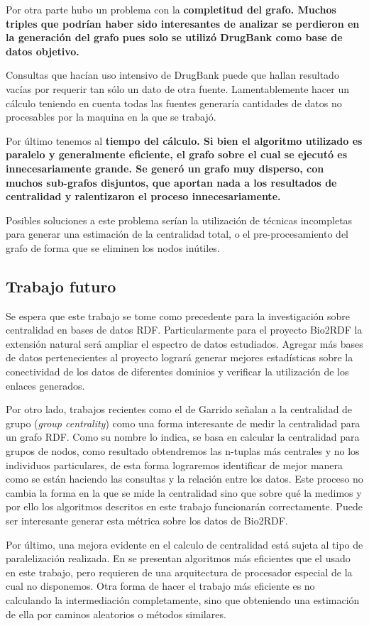 Por otra parte hubo un problema con la \bf{completitud del grafo.}
Muchos triples que podrían haber sido interesantes de analizar se perdieron en
la generación del grafo pues solo se utilizó DrugBank como base de datos
objetivo.

Consultas que hacían uso intensivo de DrugBank puede que hallan resultado vacías
por requerir tan sólo un dato de otra fuente.
Lamentablemente hacer un cálculo teniendo en cuenta todas las fuentes generaría
cantidades de datos no procesables por la maquina en la que se trabajó.

Por último tenemos al \bf{tiempo del cálculo.}
Si bien el algoritmo utilizado es paralelo y generalmente eficiente, el grafo
sobre el cual se ejecutó es innecesariamente grande. 
Se generó un grafo muy disperso, con muchos sub-grafos disjuntos, que aportan
nada a los resultados de centralidad y ralentizaron el proceso innecesariamente.

Posibles soluciones a este problema serían la utilización de técnicas
incompletas para generar una estimación de la centralidad total, o el
pre-procesamiento del grafo de forma que se eliminen los nodos inútiles.

\subsection{Trabajo futuro}\label{sec:con:tf}
Se espera que este trabajo se tome como precedente para la investigación sobre
centralidad en bases de datos RDF.
Particularmente para el proyecto Bio2RDF la extensión natural será ampliar el
espectro de datos estudiados. Agregar más bases de datos pertenecientes al
proyecto logrará generar mejores estadísticas sobre la conectividad de los datos
de diferentes dominios y verificar la utilización de los enlaces generados.

Por otro lado, trabajos recientes como el de Garrido 
\etal\cite{garrido2016group} señalan a la centralidad de grupo (\emph{group
centrality}) como una forma interesante de medir la centralidad para un grafo
RDF.
Como su nombre lo indica, se basa en calcular la centralidad para
grupos de nodos, como resultado obtendremos las n-tuplas más centrales y no los
individuos particulares, de esta forma lograremos identificar de mejor manera
como se están haciendo las consultas y la relación entre los datos.
Este proceso no cambia la forma en la que se mide la
centralidad sino que sobre qué la medimos y por ello los algoritmos descritos
en este trabajo funcionarán correctamente.
Puede ser interesante generar esta métrica sobre los datos de Bio2RDF.

Por último, una mejora evidente en el calculo de centralidad está sujeta al tipo
de paralelización realizada. En \cite{madduri2009faster} se presentan algoritmos
más eficientes que el usado en este trabajo, pero requieren de una arquitectura
de procesador especial de la cual no disponemos.
Otra forma de hacer el trabajo más eficiente es no calculando la intermediación
completamente, sino que obteniendo una estimación de ella por caminos
aleatorios o métodos similares.
